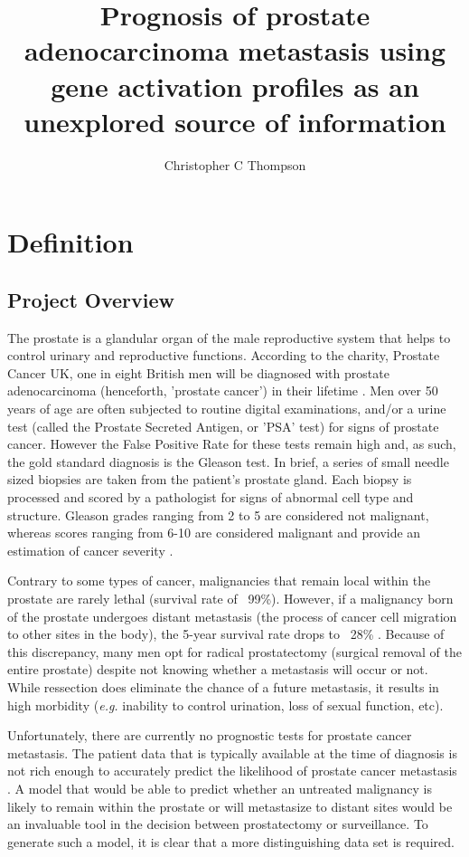 \documentclass[final]{article}
\title{Prognosis of prostate adenocarcinoma metastasis using gene activation profiles as an unexplored source of information}
\author{Christopher C Thompson}
\begin{document}
\maketitle

\section{Definition}

\subsection{Project Overview}

The prostate is a glandular organ of the male reproductive system that helps to
control urinary and reproductive functions.  According to the charity, Prostate
Cancer UK, one in eight British men will  be diagnosed with prostate
adenocarcinoma (henceforth, 'prostate cancer') in their  lifetime \cite{PCUK}.
Men over 50 years of age are often subjected to routine digital examinations,
and/or a urine test (called the Prostate Secreted Antigen, or 'PSA' test) for
signs of prostate cancer.  However the False Positive Rate for these tests remain high \cite{Brawley16} and,
as such,  the gold standard diagnosis is the Gleason test.  In brief, a series
of small needle sized biopsies are taken from the patient's prostate gland.
Each biopsy is processed and scored by a pathologist for signs of abnormal cell
type and structure.  Gleason grades ranging from 2 to 5 are considered not
malignant, whereas scores ranging from 6-10 are considered malignant and provide
an estimation of cancer severity \cite{Humphrey04}.

Contrary to some types of cancer, malignancies that remain local within the
prostate are rarely lethal (survival rate of ~99\%).  However, if a malignancy
born of the prostate undergoes distant metastasis (the process of cancer cell
migration to other sites in the body), the 5-year survival rate drops to ~28\%
\cite{CancerOrg}. Because of this discrepancy, many men opt for radical
prostatectomy (surgical removal of the entire prostate) despite not knowing
whether a metastasis will occur or not.  While ressection does eliminate the
chance of a future  metastasis, it results in high morbidity (\textit{e.g.}
inability to control urination, loss of sexual function, etc).

Unfortunately, there are currently no prognostic tests for prostate cancer metastasis.  The
patient data  that is typically available at the time of diagnosis is not rich
enough to accurately predict the likelihood of prostate cancer metastasis \cite{Brawley16}.   A
model that would be able to predict whether an untreated malignancy is likely to
remain within the prostate or will metastasize to distant sites would be an invaluable tool
in the decision between prostatectomy or surveillance.  To
generate such a model, it is clear that a more distinguishing data set is required.
\end{document}
